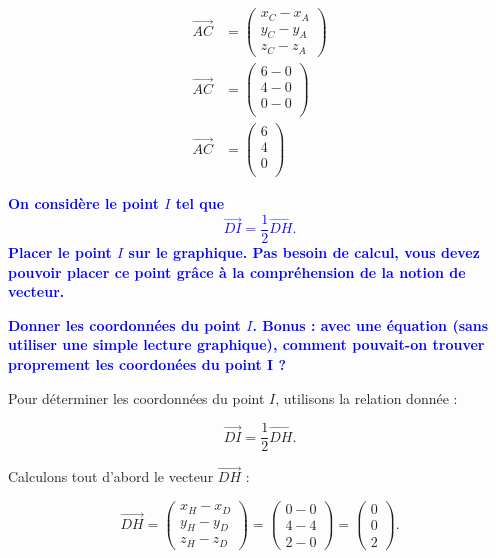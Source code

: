 \documentclass{exam}
\begin{document}
\begin{questions}
    \begin{align*}
      \overrightarrow{AC} &= \begin{pmatrix}
        x_{C} - x_{A} \\
        y_{C} - y_{A} \\ 
        z_{C} - z_{A}
      \end{pmatrix} \\
      \overrightarrow{AC} &= \begin{pmatrix}
        6 - 0 \\
        4 - 0 \\
        0 - 0 \\
      \end{pmatrix} \\
      \overrightarrow{AC} &= \begin{pmatrix}
        6 \\
        4 \\
        0 \\
      \end{pmatrix}
    \end{align*}


    \question[0.5] \textbf{\textcolor{blue}{On considère le point $I$ tel que 
    \[
    \overrightarrow{DI} = \frac{1}{2} \overrightarrow{DH}.
    \]
    Placer le point $I$ sur le graphique. Pas besoin de calcul, vous devez pouvoir placer ce point grâce à la compréhension de la notion de vecteur.}}

    \question[0.5] \textbf{\textcolor{blue}{Donner les coordonnées du point $I$. Bonus : avec une équation (sans utiliser une simple lecture graphique), comment pouvait-on trouver proprement les coordonées du point I ?}}

    Pour déterminer les coordonnées du point $I$, utilisons la relation donnée :

\[
\overrightarrow{DI} = \frac{1}{2} \overrightarrow{DH}.
\]

Calculons tout d'abord le vecteur $\overrightarrow{DH}$ :

\[
\overrightarrow{DH} = 
\begin{pmatrix}
x_H - x_D \\
y_H - y_D \\
z_H - z_D
\end{pmatrix}
=
\begin{pmatrix}
0 - 0 \\
4 - 4 \\
2 - 0
\end{pmatrix}
=
\begin{pmatrix}
0 \\
0 \\
2
\end{pmatrix}.
\]


\end{questions}
\end{document}
